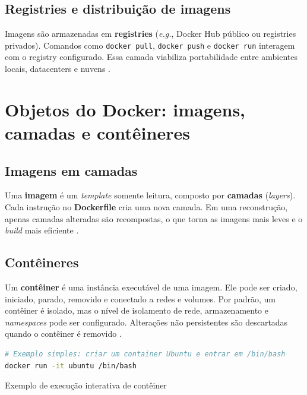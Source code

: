 \subsection{Registries e distribuição de imagens}
\label{subsec:docker-registries}

Imagens são armazenadas em \textbf{registries} (\textit{e.g.}, Docker Hub público ou registries privados). Comandos como \texttt{docker pull}, \texttt{docker push} e \texttt{docker run} interagem com o registry configurado. Essa camada viabiliza portabilidade entre ambientes locais, datacenters e nuvens \cite{docker_overview}. 

\section{Objetos do Docker: imagens, camadas e contêineres}
\label{sec:docker-objetos}

\subsection{Imagens em camadas}
\label{subsec:docker-imagens}

Uma \textbf{imagem} é um \textit{template} somente leitura, composto por \textbf{camadas} (\textit{layers}). Cada instrução no \textbf{Dockerfile} cria uma nova camada. Em uma reconstrução, apenas camadas alteradas são recompostas, o que torna as imagens mais leves e o \textit{build} mais eficiente \cite{docker_overview}. 

\subsection{Contêineres}
\label{subsec:docker-containers}

Um \textbf{contêiner} é uma instância executável de uma imagem. Ele pode ser criado, iniciado, parado, removido e conectado a redes e volumes. Por padrão, um contêiner é isolado, mas o nível de isolamento de rede, armazenamento e \textit{namespaces} pode ser configurado. Alterações não persistentes são descartadas quando o contêiner é removido \cite{docker_overview}. 

\begin{codigo}[H]
\begin{lstlisting}[language=bash]
# Exemplo simples: criar um container Ubuntu e entrar em /bin/bash
docker run -it ubuntu /bin/bash
\end{lstlisting}
\caption{Exemplo de execução interativa de contêiner}
\label{lst:docker-run}
\end{codigo}

